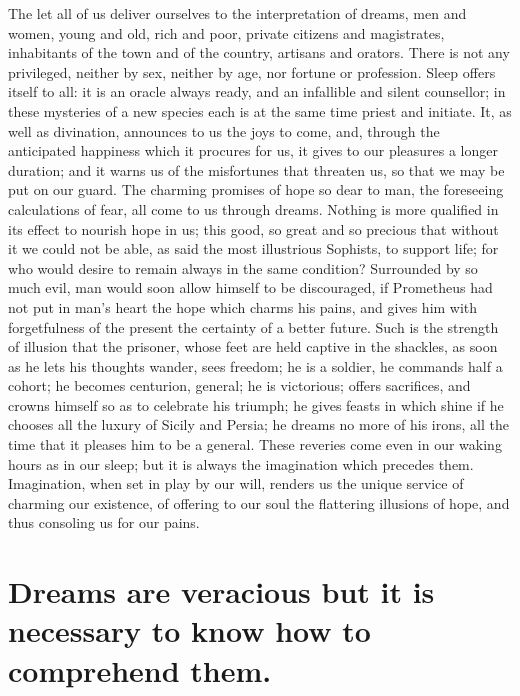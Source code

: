 \documentclass[12pt]{article}
\begin{document}
The let all of us deliver ourselves to the interpretation of dreams, men and
women, young and old, rich and poor, private citizens and magistrates,
inhabitants of the town and of the country, artisans and orators. There is not
any privileged, neither by sex, neither by age, nor fortune or profession.
Sleep offers itself to all: it is an oracle always ready, and an infallible and
silent counsellor; in these mysteries of a new species each is at the same time
priest and initiate. It, as well as divination, announces to us the joys to
come, and, through the anticipated happiness which it procures for us, it gives
to our pleasures a longer duration; and it warns us of the misfortunes that
threaten us, so that we may be put on our guard. The charming promises of hope
so dear to man, the foreseeing calculations of fear, all come to us through
dreams. Nothing is more qualified in its effect to nourish hope in us; this
good, so great and so precious that without it we could not be able, as said
the most illustrious Sophists, to support life; for who would desire to remain
always in the same condition? Surrounded by so much evil, man would soon allow
himself to be discouraged, if Prometheus had not put in man's heart the hope
which charms his pains, and gives him with forgetfulness of the present the
certainty of a better future. Such is the strength of illusion that the
prisoner, whose feet are held captive in the shackles, as soon as he lets his
thoughts wander, sees freedom; he is a soldier, he commands half a cohort; he
becomes centurion, general; he is victorious; offers sacrifices, and crowns
himself so as to celebrate his triumph; he gives feasts in which shine if he
chooses all the luxury of Sicily and Persia; he dreams no more of his irons,
all the time that it pleases him to be a general. These reveries come even in
our waking hours as in our sleep; but it is always the imagination which
precedes them. Imagination, when set in play by our will, renders us the unique
service of charming our existence, of offering to our soul the flattering
illusions of hope, and thus consoling us for our pains.


\section{Dreams are veracious but it is necessary to know how to comprehend
them.}
\end{document}
